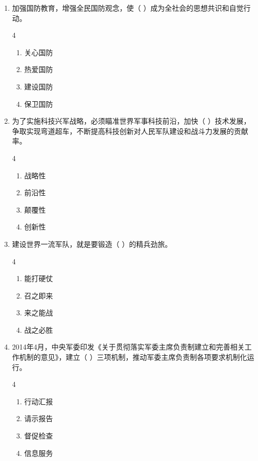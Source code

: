 \documentclass[a4paper,11pt]{ctexart}
\begin{document}
\begin{enumerate}
    \item 加强国防教育，增强全民国防观念，使（ ）成为全社会的思想共识和自觉行动。
    \begin{multicols}{4}
    \begin{enumerate}
        \item 关心国防
        \item 热爱国防
        \item 建设国防
        \item 保卫国防
    \end{enumerate}
    \end{multicols}

    \item 为了实施科技兴军战略，必须瞄准世界军事科技前沿，加快（ ）技术发展，争取实现弯道超车，不断提高科技创新对人民军队建设和战斗力发展的贡献率。
    \begin{multicols}{4}
    \begin{enumerate}
        \item 战略性
        \item 前沿性
        \item 颠覆性
        \item 创新性
    \end{enumerate}
    \end{multicols}

    \item 建设世界一流军队，就是要锻造（ ）的精兵劲旅。
    \begin{multicols}{4}
    \begin{enumerate}
        \item 能打硬仗
        \item 召之即来
        \item 来之能战
        \item 战之必胜
    \end{enumerate}
    \end{multicols}

    \item 2014年4月，中央军委印发《关于贯彻落实军委主席负责制建立和完善相关工作机制的意见》，建立（ ）三项机制，推动军委主席负责制各项要求机制化运行。
    \begin{multicols}{4}
    \begin{enumerate}
        \item 行动汇报
        \item 请示报告
        \item 督促检查
        \item 信息服务
    \end{enumerate}
    \end{multicols}


\end{enumerate}
\end{document}
